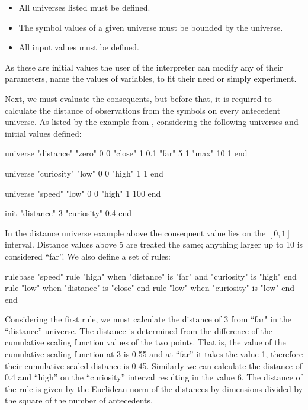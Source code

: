 \begin{itemize}
	\item All universes listed must be defined.
	\item The symbol values of a given universe must be bounded by the universe.
	\item All input values must be defined.
\end{itemize}

As these are initial values the user of the interpreter can modify any of their parameters, name the values of variables, to fit their need or simply experiment.

Next, we must evaluate the consequents, but before that, it is required to calculate the distance of observations from the symbols on every antecedent universe. As listed by the example from \cite{pillerkovacs2019}, considering the following universes and initial values defined:

\begin{fbdl}
universe "distance"
  "zero" 0 0
  "close" 1 0.1
  "far" 5 1
  "max" 10 1
end
\end{fbdl}

\begin{fbdl}
universe "curiosity"
  "low" 0 0
  "high" 1 1
end
\end{fbdl}

\begin{fbdl}
universe "speed" 
  "low" 0 0 
  "high" 1 100 
end 
\end{fbdl}

\begin{fbdl}
init
  "distance" 3
  "curiosity" 0.4
end
\end{fbdl}

\noindent In the distance universe example above the consequent value lies on the $[0, 1]$ interval. Distance values above 5 are treated the same; anything larger up to 10 is considered ``far''.
We also define a set of rules:

\begin{fbdl}
rulebase "speed" 
  rule "high" when "distance" is "far" and "curiosity" is "high" end 
  rule "low" when "distance" is "close" end 
  rule "low" when "curiosity" is "low" end 
end
\end{fbdl}

Considering the first rule, we must calculate the distance of 3 from ``far" in the ``distance” universe. The distance is determined from the difference of the cumulative scaling function values of the two points. That is, the value of the cumulative scaling function at 3 is 0.55 and at ``far” it takes the value 1, therefore their cumulative scaled distance is 0.45. Similarly we can calculate the distance of 0.4 and “high” on the “curiosity” interval resulting in the value 6. The distance of the rule is given by the Euclidean norm of the distances by dimensions divided by the square of the number of antecedents.

